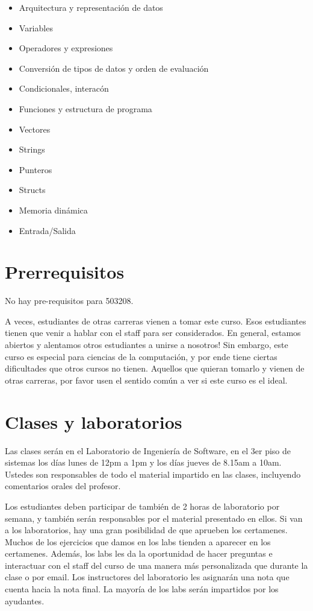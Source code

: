 \documentclass[11pt]{article}
\begin{document}
\begin{itemize}
\item Arquitectura y representaci\'on de datos
\item Variables
\item Operadores y expresiones
\item Conversi\'on de tipos de datos y orden de evaluaci\'on
\item Condicionales, interac\'on
\item Funciones y estructura de programa
\item Vectores
\item Strings
\item Punteros
\item Structs
\item Memoria din\'amica
\item Entrada/Salida
\end{itemize}

\section{Prerrequisitos}
\label{sec:preqs}

No hay pre-requisitos para 503208.

A veces, estudiantes de otras carreras vienen a tomar este curso. Esos
estudiantes tienen que venir a hablar con el staff para ser
considerados. En general, estamos abiertos y alentamos otros
estudiantes a unirse a nosotros! Sin embargo, este curso es especial
para ciencias de la computaci\'on, y por ende tiene ciertas
dificultades que otros cursos no tienen. Aquellos que quieran tomarlo
y vienen de otras carreras, por favor usen el sentido com\'un a ver si
este curso es el ideal.

\section{Clases y laboratorios}
\label{sec:clases}

Las clases ser\'an en el Laboratorio de Ingenier\'ia de Software, en
el 3er piso de sistemas los d\'ias lunes de 12pm a 1pm y los d\'ias
jueves de 8.15am a 10am. Ustedes son responsables de todo el material
impartido en las clases, incluyendo comentarios orales del profesor.

Los estudiantes deben participar de tambi\'en de 2 horas de
laboratorio por semana, y tambi\'en ser\'an responsables por el
material presentado en ellos. Si van a los laboratorios, hay una gran
posibilidad de que aprueben los certamenes. Muchos de los ejercicios
que damos en los labs tienden a aparecer en los certamenes. Adem\'as,
los labs les da la oportunidad de hacer preguntas e interactuar con el
staff del curso de una manera m\'as personalizada que durante la clase
o por email. Los instructores del laboratorio les asignar\'an una nota
que cuenta hacia la nota final. La mayor\'ia de los labs ser\'an
impartidos por los ayudantes.
\end{document}
